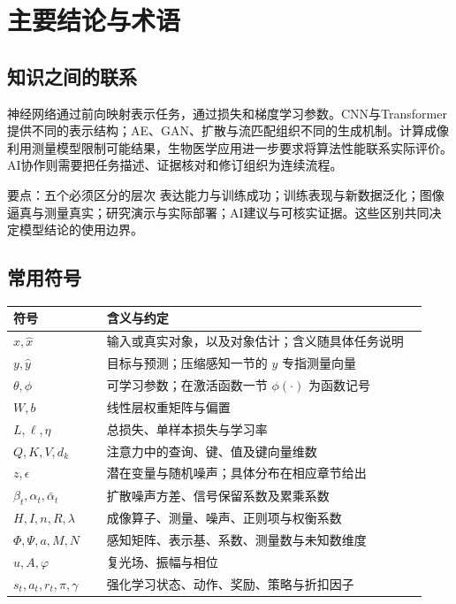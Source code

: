 \documentclass[UTF8,fontset=none,zihao=-4,a4paper]{ctexart}
\newcommand{\chapterpage}[1]{\clearpage\section{#1}}
\begin{document}
\chapterpage{主要结论与术语}
\subsection{知识之间的联系}
神经网络通过前向映射表示任务，通过损失和梯度学习参数。CNN与Transformer提供不同的表示结构；AE、GAN、扩散与流匹配组织不同的生成机制。计算成像利用测量模型限制可能结果，生物医学应用进一步要求将算法性能联系实际评价。AI协作则需要把任务描述、证据核对和修订组织为连续流程。

\begin{infobox}{要点：五个必须区分的层次}
表达能力与训练成功；训练表现与新数据泛化；图像逼真与测量真实；研究演示与实际部署；AI建议与可核实证据。这些区别共同决定模型结论的使用边界。
\end{infobox}

\subsection{常用符号}
\begin{longtable}{p{0.21\linewidth}p{0.72\linewidth}}
\toprule 符号 & 含义与约定\\\midrule\endhead
$x,\hat x$ & 输入或真实对象，以及对象估计；含义随具体任务说明\\
$y,\hat y$ & 目标与预测；压缩感知一节的 $y$ 专指测量向量\\
$\theta,\phi$ & 可学习参数；在激活函数一节 $\phi(\cdot)$ 为函数记号\\
$W,b$ & 线性层权重矩阵与偏置\\
$L,\ell,\eta$ & 总损失、单样本损失与学习率\\
$Q,K,V,d_k$ & 注意力中的查询、键、值及键向量维数\\
$z,\epsilon$ & 潜在变量与随机噪声；具体分布在相应章节给出\\
$\beta_t,\alpha_t,\bar\alpha_t$ & 扩散噪声方差、信号保留系数及累乘系数\\
$H,I,n,R,\lambda$ & 成像算子、测量、噪声、正则项与权衡系数\\
$\Phi,\Psi,a,M,N$ & 感知矩阵、表示基、系数、测量数与未知数维度\\
$u,A,\varphi$ & 复光场、振幅与相位\\
$s_t,a_t,r_t,\pi,\gamma$ & 强化学习状态、动作、奖励、策略与折扣因子\\\bottomrule
\end{longtable}
\end{document}
